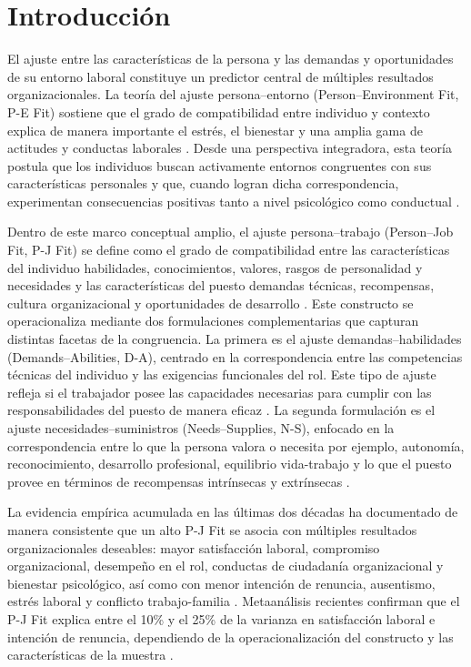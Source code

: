 \section{Introducción}

El ajuste entre las características de la persona y las demandas y oportunidades de su entorno laboral constituye un predictor central de múltiples resultados organizacionales. La teoría del ajuste persona--entorno (Person--Environment Fit, P-E Fit) sostiene que el grado de compatibilidad entre individuo y contexto explica de manera importante el estrés, el bienestar y una amplia gama de actitudes y conductas laborales \cite{edwards_person-job_1991,kristofBrown2005}. Desde una perspectiva integradora, esta teoría postula que los individuos buscan activamente entornos congruentes con sus características personales y que, cuando logran dicha correspondencia, experimentan consecuencias positivas tanto a nivel psicológico como conductual \cite{edwards1999}.

Dentro de este marco conceptual amplio, el ajuste persona--trabajo (Person--Job Fit, P-J Fit) se define como el grado de compatibilidad entre las características del individuo habilidades, conocimientos, valores, rasgos de personalidad y necesidades y las características del puesto demandas técnicas, recompensas, cultura organizacional y oportunidades de desarrollo \cite{edwards_person-job_1991,kristofBrown2005}. Este constructo se operacionaliza mediante dos formulaciones complementarias que capturan distintas facetas de la congruencia. La primera es el ajuste demandas--habilidades (Demands--Abilities, D-A), centrado en la correspondencia entre las competencias técnicas del individuo y las exigencias funcionales del rol. Este tipo de ajuste refleja si el trabajador posee las capacidades necesarias para cumplir con las responsabilidades del puesto de manera eficaz \cite{Cable2002}. La segunda formulación es el ajuste necesidades--suministros (Needs--Supplies, N-S), enfocado en la correspondencia entre lo que la persona valora o necesita por ejemplo, autonomía, reconocimiento, desarrollo profesional, equilibrio vida-trabajo y lo que el puesto provee en términos de recompensas intrínsecas y extrínsecas \cite{edwards1999}.

La evidencia empírica acumulada en las últimas dos décadas ha documentado de manera consistente que un alto P-J Fit se asocia con múltiples resultados organizacionales deseables: mayor satisfacción laboral, compromiso organizacional, desempeño en el rol, conductas de ciudadanía organizacional y bienestar psicológico, así como con menor intención de renuncia, ausentismo, estrés laboral y conflicto trabajo-familia \cite{kristofBrown2005}. Metaanálisis recientes confirman que el P-J Fit explica entre el 10\% y el 25\% de la varianza en satisfacción laboral e intención de renuncia, dependiendo de la operacionalización del constructo y las características de la muestra \cite{Cable2002,kristofBrown2005}.

